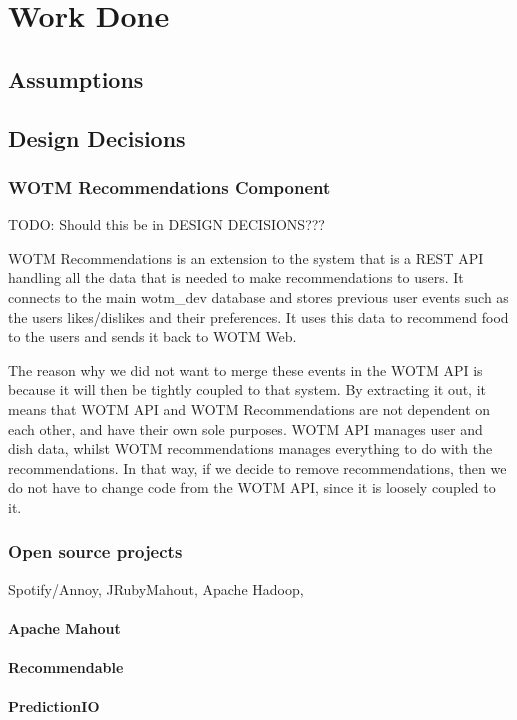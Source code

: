 \chapter{Work Done}\label{C:work_done}

\section{Assumptions}

\section{Design Decisions}

\subsection{WOTM Recommendations Component}
TODO: Should this be in DESIGN DECISIONS???

WOTM Recommendations is an extension to the system that is a REST API handling all the data that is needed to make recommendations to users. It connects to the main wotm\_dev database and stores previous user events such as the users likes/dislikes and their preferences. It uses this data to recommend food to the users and sends it back to WOTM Web. 

The reason why we did not want to merge these events in the WOTM API is because it will then be tightly coupled to that system. By extracting it out, it means that WOTM API and WOTM Recommendations are not dependent on each other, and have their own sole purposes. WOTM API manages user and dish data, whilst WOTM recommendations manages everything to do with the recommendations. In that way, if we decide to remove recommendations, then we do not have to change code from the WOTM API, since it is loosely coupled to it. 

\subsection{Open source projects}
Spotify/Annoy, JRubyMahout, Apache Hadoop, 
\subsubsection{Apache Mahout}
\subsubsection{Recommendable}
\subsubsection{PredictionIO}
